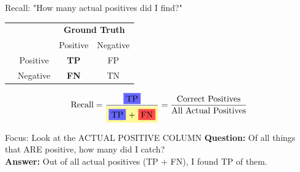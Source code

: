\documentclass[dvipsnames]{beamer}
\begin{document}
\begin{frame}{Recall: "How many actual positives did I find?"}
\vspace{2pt}
\begin{center}
\begin{tabular}{@{}cc cc@{}}
	\multicolumn{1}{c}{} &\multicolumn{1}{c}{} &\multicolumn{2}{c}{\textbf{Ground Truth}} \\ 
	\cmidrule(lr){3-4}
	\multicolumn{1}{c}{} & 
	\multicolumn{1}{c}{} & 
	\multicolumn{1}{c}{\colorbox{yellow!40}{Positive}} & 
	\multicolumn{1}{c}{Negative} \\ 
	\cline{2-4}
	\multirow[c]{2}{*}{\rotatebox[origin=tr]{90}{\textbf{Predicted}}}
	& Positive  & \cellcolor{blue!60}\textbf{TP} & \cellcolor{gray!30}FP   \\[1.2ex]
	& Negative  & \cellcolor{red!70}\textbf{FN}   & \cellcolor{gray!30}TN \\ 
	\cline{2-4}
\end{tabular}
\end{center}
\vspace{6pt}
$$\text{Recall} = \frac{\colorbox{blue!60}{\text{TP}}}{\colorbox{yellow!40}{\colorbox{blue!60}{\text{TP}} + \colorbox{red!70}{\text{FN}}}} = \frac{\text{Correct Positives}}{\text{All Actual Positives}}$$
\pause
\vspace{-0.3em}
\begin{alertblock}{Focus: Look at the ACTUAL POSITIVE COLUMN}
\textbf{Question:} Of all things that ARE positive, how many did I catch?\\
\textbf{Answer:} Out of all actual positives (TP + FN), I found TP of them.
\end{alertblock}
\end{frame}
\end{document}
